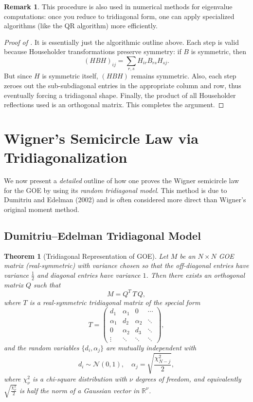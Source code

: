 \documentclass[letterpaper,11pt,oneside,reqno]{article}
\numberwithin{equation}{section}
\newtheorem{theorem}[proposition]{Theorem}
\theoremstyle{definition}
\newtheorem{remark}[proposition]{Remark}
\begin{document}
\begin{remark}
This procedure is also used in numerical methods for eigenvalue computations: once you reduce to tridiagonal form, one can apply specialized algorithms (like the QR algorithm) more efficiently.
\end{remark}

\begin{proof}[Proof of ]
It is essentially just the algorithmic outline above.  Each step is valid because Householder transformations preserve symmetry: if \(B\) is symmetric, then
\[
  (H B H)_{ij}
  = \sum_{r,s} H_{ir} B_{rs} H_{sj}.
\]
But since \(H\) is symmetric itself, \((H B H)\) remains symmetric.  Also, each step zeroes out the sub-subdiagonal entries in the appropriate column and row, thus eventually forcing a tridiagonal shape.  Finally, the product of all Householder reflections used is an orthogonal matrix. This completes the argument.
\end{proof}

\section{Wigner’s Semicircle Law via Tridiagonalization}
\label{sec:Wigner-SC-detailed}

We now present a \emph{detailed} outline of how one proves the Wigner semicircle law for the GOE by using its \emph{random tridiagonal model}. This method is due to Dumitriu and Edelman (2002) and is often considered more direct than Wigner’s original moment method.

\subsection{Dumitriu–Edelman Tridiagonal Model}

\begin{theorem}[Tridiagonal Representation of GOE]
\label{thm:DE-model}
Let \(M\) be an \(N\times N\) GOE matrix (real-symmetric) with variance chosen so that the off-diagonal entries have variance \(\tfrac12\) and diagonal entries have variance \(1\).  Then there exists an orthogonal matrix \(Q\) such that
\[
   M = Q^T\,T\,Q,
\]
where \(T\) is a real-symmetric tridiagonal matrix of the special form
\[
   T = \begin{pmatrix}
         d_1 & \alpha_1 & 0 & \cdots \\
         \alpha_1 & d_2 & \alpha_2 & \ddots \\
         0 & \alpha_2 & d_3 & \ddots \\
         \vdots & \ddots & \ddots & \ddots
       \end{pmatrix},
\]
and the random variables \(\{d_i,\alpha_j\}\) are mutually independent with
\[
  d_i \sim \mathcal{N}(0,1),
  \quad
  \alpha_j = \sqrt{\frac{\chi^2_{N-j}}{2}},
\]
where \(\chi^2_{\nu}\) is a chi-square distribution with \(\nu\) degrees of freedom, and equivalently \(\sqrt{\tfrac{\chi^2_\nu}{2}}\) is half the norm of a Gaussian vector in \(\mathbb{R}^\nu\).
\end{theorem}
\end{document}
